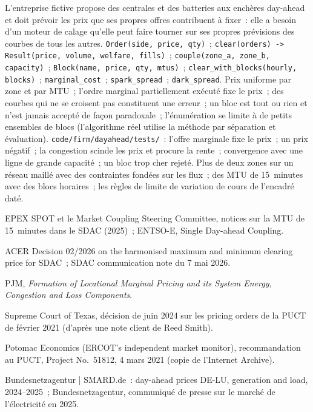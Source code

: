 \begin{build}
 L'entreprise fictive propose des centrales et des batteries aux enchères day-ahead et
doit prévoir les prix que ses propres offres contribuent à fixer~: elle a besoin d'un moteur de calage qu'elle peut faire tourner sur ses
propres prévisions des courbes de tous les autres.
 \texttt{Order(side, price, qty)}~; \texttt{clear(orders) -> Result(price,
volume, welfare, fills)}~; \texttt{couple(zone\_a, zone\_b, capacity)}~;
\texttt{Block(name, price, qty, mtus)}~; \texttt{clear\_with\_blocks(hourly, blocks)}~;
\texttt{marginal\_cost}~; \texttt{spark\_spread}~; \texttt{dark\_spread}.
 Prix uniforme par zone et par MTU~; l'ordre marginal partiellement exécuté fixe le
prix~; des courbes qui ne se croisent pas constituent une erreur~; un bloc est tout ou rien et n'est jamais
accepté de façon paradoxale~; l'énumération se limite à de petits ensembles de blocs (l'algorithme réel
utilise la méthode par séparation et évaluation).
 \texttt{code/firm/dayahead/tests/}~: l'offre marginale fixe le
prix~; un prix négatif~; la congestion scinde les prix et procure la rente~; convergence avec une
ligne de grande capacité~; un bloc trop cher rejeté.
 Plus de deux zones sur un réseau maillé avec des contraintes fondées sur les flux~;
des MTU de 15~minutes avec des blocs horaires~; les règles de limite de variation de cours de l'encadré daté.
\end{build}

\begin{omsources}
\item EPEX SPOT et le Market Coupling Steering Committee, notices sur la MTU de 15~minutes
dans le SDAC (2025)~; ENTSO-E, Single Day-ahead Coupling.
\item ACER Decision 02/2026 on the harmonised maximum and minimum clearing price for SDAC~;
SDAC communication note du 7 mai 2026.
\item PJM, \emph{Formation of Locational Marginal Pricing and its System Energy,
Congestion and Loss Components}.
\item Supreme Court of Texas, décision de juin 2024 sur les pricing orders de la PUCT de février
2021 (d'après une note client de Reed Smith).
\item Potomac Economics (ERCOT's independent market monitor), recommandation au PUCT,
Project No.\ 51812, 4 mars 2021 (copie de l'Internet Archive).
\item Bundesnetzagentur | SMARD.de~: day-ahead prices DE-LU, generation and load, 2024--2025~; Bundesnetzagentur, communiqué de presse
sur le marché de l'électricité en 2025.
\end{omsources}

